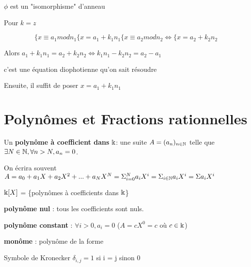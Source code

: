 \documentclass[a4paper, 12pt]{article}
\begin{document}
\begin{remark}
    $\phi$ est un "isomorphisme" d'anneau
\end{remark}

Pour $k = z$

$$
\{ x \equiv a_1 mod n_1      \{ x =  a_1 + k_1 n_1
\{ x \equiv a_2 mod n_2 \iff \{ x = a_2 + k_2 n_2
$$

Alors $a_1 + k_1 n_1 = a_2 + k_2 n_2 \iff k_1 n_1 - k_2 n_2 = a_2 - a_1$

c'est une équation diophotienne qu'on sait résoudre

Ensuite, il suffit de poser $x = a_1 + k_1 n_1$

\section{Polynômes et Fractions rationnelles}

\begin{definition}
    Un \textbf{polynôme à coefficient dans} $\Bbbk$: une suite $A = (a_n)_{n \in \mathbb{N}}$
    telle que $\exists N \in \mathbb{N}, \forall n > N, a_n = 0$.

    On écrira souvent $A = a_0 + a_1X + a_2X^2 + ... + a_NX^N = \Sigma_{i=0}^N a_iX^i = \Sigma_{i \in \mathbb{N}} a_iX^i = \Sigma a_iX^i$

    \item $\Bbbk[X]$ = \{polynômes à coefficients dans $\Bbbk$\}
    \item \textbf{polynôme nul} : tous les coefficients sont nuls.
    \item \textbf{polynôme constant} : $\forall i \gt 0, a_i = 0$ ($A = cX^0 = c$ où $c \in \Bbbk$)
    \item \textbf{monôme} : polynôme de la forme %
\end{definition}

Symbole de Kronecker $\delta_{i,j} = 1$ si i = j sinon 0

\end{document}

